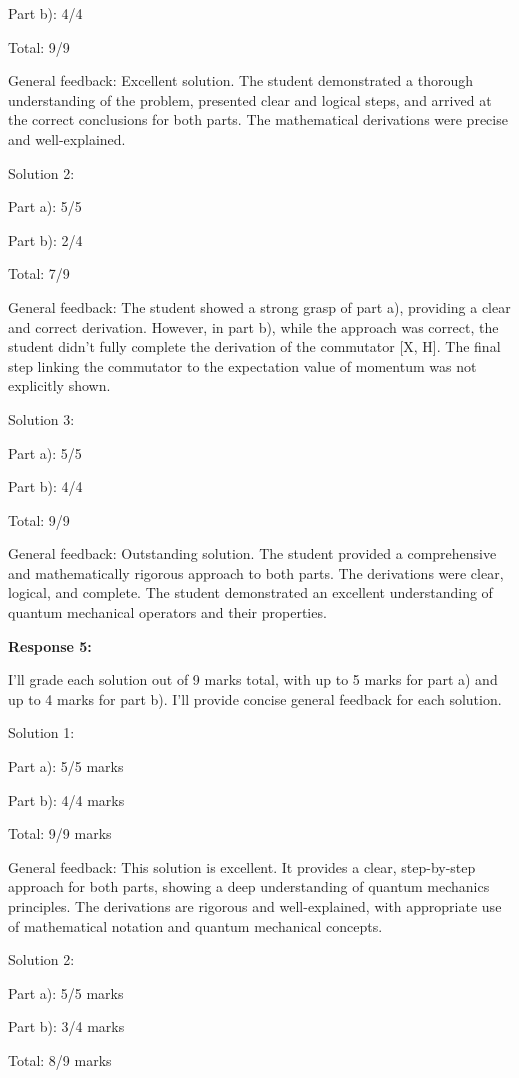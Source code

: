 \documentclass[a4paper,11pt]{article}
\begin{document}
Part b): 4/4

Total: 9/9

General feedback: Excellent solution. The student demonstrated a thorough understanding of the problem, presented clear and logical steps, and arrived at the correct conclusions for both parts. The mathematical derivations were precise and well-explained.

Solution 2:

Part a): 5/5

Part b): 2/4

Total: 7/9

General feedback: The student showed a strong grasp of part a), providing a clear and correct derivation. However, in part b), while the approach was correct, the student didn't fully complete the derivation of the commutator [X, H]. The final step linking the commutator to the expectation value of momentum was not explicitly shown.

Solution 3:

Part a): 5/5

Part b): 4/4

Total: 9/9

General feedback: Outstanding solution. The student provided a comprehensive and mathematically rigorous approach to both parts. The derivations were clear, logical, and complete. The student demonstrated an excellent understanding of quantum mechanical operators and their properties.

\bigskip   
\textbf{Response 5:}

I'll grade each solution out of 9 marks total, with up to 5 marks for part a) and up to 4 marks for part b). I'll provide concise general feedback for each solution.

Solution 1:

Part a): 5/5 marks

Part b): 4/4 marks

Total: 9/9 marks

General feedback: This solution is excellent. It provides a clear, step-by-step approach for both parts, showing a deep understanding of quantum mechanics principles. The derivations are rigorous and well-explained, with appropriate use of mathematical notation and quantum mechanical concepts.

Solution 2:

Part a): 5/5 marks

Part b): 3/4 marks

Total: 8/9 marks
\end{document}
